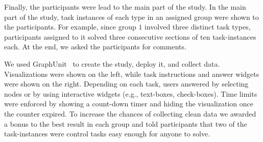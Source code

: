Finally, the participants were lead to the main part of the study. 
In the main part of the study, task instances of each type in an assigned group were shown to the participants. %
For example, since group $1$ involved three distinct task types, participants assigned to it solved three consecutive sections of ten task-instances each. %
At the end, we asked the participants for comments.

We used GraphUnit~\cite{okoe2015graphunit} to create the study, deploy it, and collect data. Visualizations were shown on the left, while task instructions and answer widgets were shown on the right. Depending on each task, users answered by selecting nodes or by using interactive widgets (e.g., text-boxes, check-boxes). Time limits were enforced by showing  a count-down timer and hiding the visualization once the counter expired. To increase the chances of collecting clean data we awarded a bonus to the best result in each group and told participants that two of the task-instances were control tasks easy enough for anyone to solve. 



